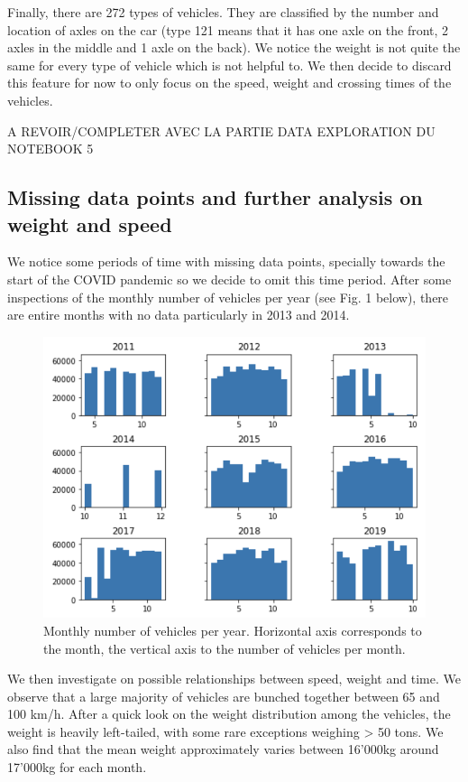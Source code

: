 \documentclass[10pt,conference,compsocconf]{IEEEtran}
\begin{document}
Finally, there are 272 types of vehicles. They are classified by the number and location of axles on the car (type 121 means that it has one axle on the front, 2 axles in the middle and 1 axle on the back). We notice the weight is not quite the same for every type of vehicle which is not helpful to. We then decide to discard this feature for now to only focus on the speed, weight and crossing times of the vehicles.

A REVOIR/COMPLETER AVEC LA PARTIE DATA EXPLORATION DU NOTEBOOK 5

\subsection{Missing data points and further analysis on weight and speed}

We notice some periods of time with missing data points, specially towards the start of the COVID pandemic so we decide to omit this time period. After some inspections of the monthly number of vehicles per year (see Fig. 1 below), there are entire months with no data particularly in 2013 and 2014. \par

\begin{figure}[ht]
  \includegraphics[scale = 0.63]{report/img/monthly-number-vehicles-per-year.png}
  \caption{Monthly number of vehicles per year. Horizontal axis corresponds to the month, the vertical axis to the number of vehicles per month.}
  \label{monthly-number-of-vehicles-per-year}
\end{figure}

We then investigate on possible relationships between speed, weight and time. We observe that a large majority of vehicles are bunched together between 65 and 100 km/h. After a quick look on the weight distribution among the vehicles, the weight is heavily left-tailed, with some rare exceptions weighing > 50 tons. We also find that the mean weight approximately varies between 16'000kg around 17'000kg for each month. 
\end{document}
